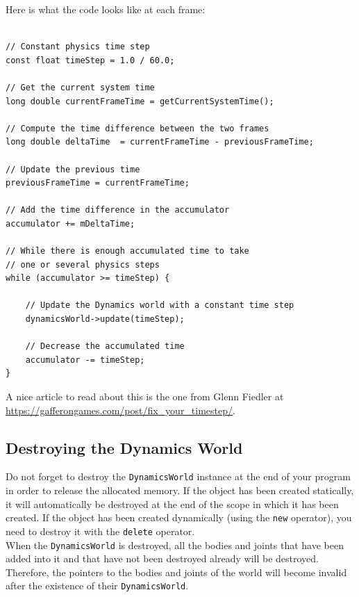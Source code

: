 \documentclass[a4paper,12pt]{article}
\begin{document}
    Here is what the code looks like at each frame: \\

    \begin{lstlisting}

// Constant physics time step
const float timeStep = 1.0 / 60.0;

// Get the current system time
long double currentFrameTime = getCurrentSystemTime();

// Compute the time difference between the two frames
long double deltaTime  = currentFrameTime - previousFrameTime;

// Update the previous time
previousFrameTime = currentFrameTime;

// Add the time difference in the accumulator
accumulator += mDeltaTime;

// While there is enough accumulated time to take
// one or several physics steps
while (accumulator >= timeStep) {

    // Update the Dynamics world with a constant time step
    dynamicsWorld->update(timeStep);

    // Decrease the accumulated time
    accumulator -= timeStep;
}

    \end{lstlisting}

    \vspace{0.6cm}

    A nice article to read about this is the one from Glenn Fiedler at \url{https://gafferongames.com/post/fix_your_timestep/}.

    \subsection{Destroying the Dynamics World}

    Do not forget to destroy the \texttt{DynamicsWorld} instance at the end of your program in order to release the allocated memory. If the object has been created
    statically, it will automatically be destroyed at the end of the scope in which it has been created. If the object has been created dynamically (using the
    \texttt{new} operator), you need to destroy it with the \texttt{delete} operator. \\

    When the \texttt{DynamicsWorld} is destroyed, all the bodies and joints that have been added into it and that have not been destroyed already will be destroyed.
    Therefore, the pointers to the bodies and joints of the world will become invalid after the existence of their \texttt{DynamicsWorld}.
\end{document}
